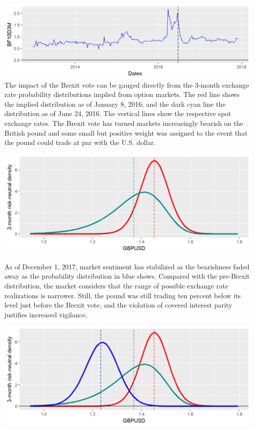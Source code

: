 \documentclass[]{book}
\theoremstyle{definition}
\theoremstyle{definition}
\theoremstyle{definition}
\theoremstyle{remark}
\begin{document}
\includegraphics[width=1\linewidth]{images/unnamed-chunk-72-1} The
impact of the Brexit vote can be gauged directly from the 3-month
exchange rate probability distributions implied from option markets. The
red line shows the implied distribution as of January 8, 2016; and the
dark cyan line the distribution as of June 24, 2016. The vertical lines
show the respective spot exchange rates. The Brexit vote has turned
markets increasingly bearish on the British pound and some small but
positive weight was assigned to the event that the pound could trade at
par with the U.S. dollar.

\includegraphics[width=1\linewidth]{images/unnamed-chunk-73-1}

As of December 1, 2017, market sentiment has stabilized as the
bearishness faded away as the probability distribution in blue shows.
Compared with the pre-Brexit distribution, the market considers that the
range of possible exchange rate realizations is narrower. Still, the
pound was still trading ten percent below its level just before the
Brexit vote, and the violation of covered interest parity justifies
increased vigilance.

\includegraphics[width=1\linewidth]{images/unnamed-chunk-74-1}
\end{document}
